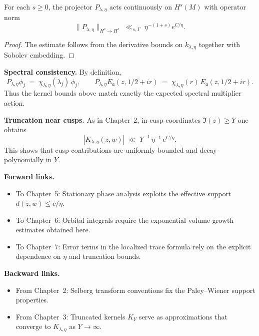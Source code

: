 \begin{lemma}\label{lem:sobolev-P}
For each $s\geq 0$, the projector $P_{\lambda,\eta}$ acts continuously on $H^{s}(M)$ with operator norm
\[
  \|P_{\lambda,\eta}\|_{H^{s}\to H^{s}} \;\ll_{s,\Gamma}\; \eta^{-(1+s)} e^{C/\eta}.
\]
\end{lemma}

\begin{proof}
The estimate follows from the derivative bounds on $k_{\lambda,\eta}$ together with Sobolev embedding.
\end{proof}

\medskip

\noindent\textbf{Spectral consistency.}
By definition,
\[
  P_{\lambda,\eta}\phi_j \;=\; \chi_{\lambda,\eta}(\lambda_j)\,\phi_j,\qquad
  P_{\lambda,\eta}E_{\mathfrak{a}}(z,1/2+ir) \;=\; \chi_{\lambda,\eta}(r)\,E_{\mathfrak{a}}(z,1/2+ir).
\]
Thus the kernel bounds above match exactly the expected spectral multiplier action.

\medskip

\noindent\textbf{Truncation near cusps.}
As in Chapter~2, in cusp coordinates $\Im(z)\ge Y$ one obtains
\[
  |K_{\lambda,\eta}(z,w)| \;\ll\; Y^{-1}\,\eta^{-1}\, e^{C/\eta}.
\]
This shows that cusp contributions are uniformly bounded and decay polynomially in $Y$.

\medskip

\noindent\textbf{Forward links.}
\begin{itemize}
  \item To Chapter~5: Stationary phase analysis exploits the effective support $d(z,w)\le c/\eta$.
  \item To Chapter~6: Orbital integrals require the exponential volume growth estimates obtained here.
  \item To Chapter~7: Error terms in the localized trace formula rely on the explicit dependence on $\eta$ and truncation bounds.
\end{itemize}

\medskip

\noindent\textbf{Backward links.}
\begin{itemize}
  \item From Chapter~2: Selberg transform conventions fix the Paley–Wiener support properties.
  \item From Chapter~3: Truncated kernels $K_Y$ serve as approximations that converge to $K_{\lambda,\eta}$ as $Y\to\infty$.
\end{itemize}

